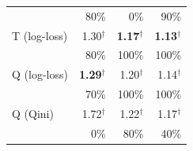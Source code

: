 \begin{tabular}{l|rrr}
 & \scriptsize 80\% & \scriptsize 0\% & \scriptsize 90\% \\[2pt]
T (log-loss) & 1.30$^\dagger$ & \textbf{1.17}$^\dagger$ & \textbf{1.13}$^\dagger$ \\
 & \scriptsize 80\% & \scriptsize 100\% & \scriptsize 100\% \\[2pt]
Q (log-loss) & \textbf{1.29}$^\dagger$ & 1.20$^\dagger$ & 1.14$^\dagger$ \\
 & \scriptsize 70\% & \scriptsize 100\% & \scriptsize 100\% \\[2pt]
Q (Qini) & 1.72$^\dagger$ & 1.22$^\dagger$ & 1.17$^\dagger$ \\
 & \scriptsize 0\% & \scriptsize 80\% & \scriptsize 40\% \\[2pt]
\hline
\end{tabular}
